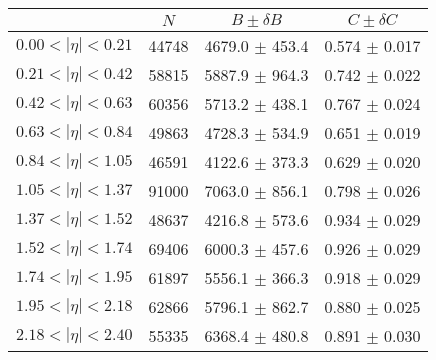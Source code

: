 \begin{tabular}{lccc}
\hline
    &   $N$   & $B \pm \delta B$  &  $C \pm \delta C$ \\
\hline
$0.00 < |\eta| <0.21$          & 44748      & 4679.0     $\pm$ 453.4 & 0.574      $\pm$ 0.017 \\
$0.21 < |\eta| <0.42$          & 58815      & 5887.9     $\pm$ 964.3 & 0.742      $\pm$ 0.022 \\
$0.42 < |\eta| <0.63$          & 60356      & 5713.2     $\pm$ 438.1 & 0.767      $\pm$ 0.024 \\
$0.63 < |\eta| <0.84$          & 49863      & 4728.3     $\pm$ 534.9 & 0.651      $\pm$ 0.019 \\
$0.84 < |\eta| <1.05$          & 46591      & 4122.6     $\pm$ 373.3 & 0.629      $\pm$ 0.020 \\
$1.05 < |\eta| <1.37$          & 91000      & 7063.0     $\pm$ 856.1 & 0.798      $\pm$ 0.026 \\
$1.37 < |\eta| <1.52$          & 48637      & 4216.8     $\pm$ 573.6 & 0.934      $\pm$ 0.029 \\
$1.52 < |\eta| <1.74$          & 69406      & 6000.3     $\pm$ 457.6 & 0.926      $\pm$ 0.029 \\
$1.74 < |\eta| <1.95$          & 61897      & 5556.1     $\pm$ 366.3 & 0.918      $\pm$ 0.029 \\
$1.95 < |\eta| <2.18$          & 62866      & 5796.1     $\pm$ 862.7 & 0.880      $\pm$ 0.025 \\
$2.18 < |\eta| <2.40$          & 55335      & 6368.4     $\pm$ 480.8 & 0.891      $\pm$ 0.030 \\
\hline
\end{tabular}
